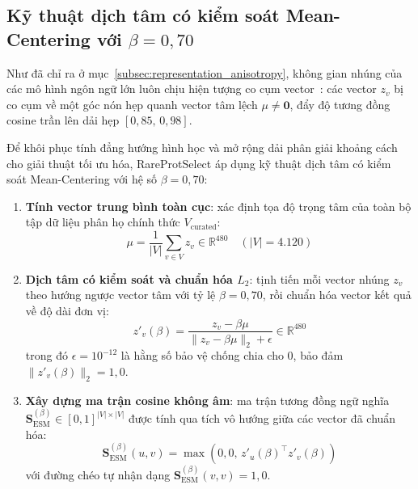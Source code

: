 \subsection{Kỹ thuật dịch tâm có kiểm soát Mean-Centering với \texorpdfstring{$\beta = 0{,}70$}{beta = 0.70}}
\label{subsec:mean_centering_technique}

Như đã chỉ ra ở mục~\ref{subsec:representation_anisotropy}, không gian nhúng của các mô hình ngôn ngữ lớn luôn chịu hiện tượng co cụm vector~\cite{ethayarajh2019}: các vector $z_v$ bị co cụm về một góc nón hẹp quanh vector tâm lệch $\mu \neq \mathbf{0}$, đẩy độ tương đồng cosine trần lên dải hẹp $[0{,}85, \, 0{,}98]$.

Để khôi phục tính đẳng hướng hình học và mở rộng dải phân giải khoảng cách cho giải thuật tối ưu hóa, RareProtSelect áp dụng kỹ thuật dịch tâm có kiểm soát Mean-Centering với hệ số $\beta = 0{,}70$:

\begin{enumerate}
    \item \textbf{Tính vector trung bình toàn cục}: xác định tọa độ trọng tâm của toàn bộ tập dữ liệu phân họ chính thức $V_{\text{curated}}$:
    \begin{equation}
    \label{eq:global_centroid}
    \mu = \frac{1}{|V|} \sum_{v \in V} z_v \in \mathbb{R}^{480} \quad (|V| = 4.120)
    \end{equation}
    
    \item \textbf{Dịch tâm có kiểm soát và chuẩn hóa $L_2$}: tịnh tiến mỗi vector nhúng $z_v$ theo hướng ngược vector tâm với tỷ lệ $\beta = 0{,}70$, rồi chuẩn hóa vector kết quả về độ dài đơn vị:
    \begin{equation}
    \label{eq:centered_vector_normalized}
    z'_v(\beta) = \frac{z_v - \beta \mu}{\|z_v - \beta \mu\|_2 + \epsilon} \in \mathbb{R}^{480}
    \end{equation}
    trong đó $\epsilon = 10^{-12}$ là hằng số bảo vệ chống chia cho 0, bảo đảm $\|z'_v(\beta)\|_2 = 1{,}0$.
    
    \item \textbf{Xây dựng ma trận cosine không âm}: ma trận tương đồng ngữ nghĩa $\mathbf{S}_{\text{ESM}}^{(\beta)} \in [0, 1]^{|V| \times |V|}$ được tính qua tích vô hướng giữa các vector đã chuẩn hóa:
    \begin{equation}
    \label{eq:esm_matrix_definition}
    \mathbf{S}_{\text{ESM}}^{(\beta)}(u, v) = \max\left(0{,}0, \, {z'_u(\beta)}^\top z'_v(\beta)\right)
    \end{equation}
    với đường chéo tự nhận dạng $\mathbf{S}_{\text{ESM}}^{(\beta)}(v, v) = 1{,}0$.
\end{enumerate}

